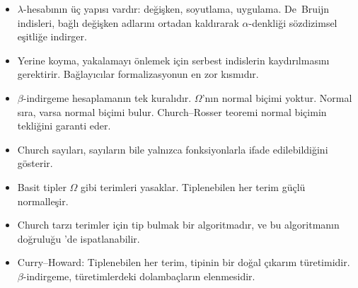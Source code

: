 \begin{bolumozeti}
\begin{itemize}
  \item $\lambda$-hesabının üç yapısı vardır: değişken, soyutlama,
        uygulama. De~Bruijn indisleri, bağlı değişken adlarını ortadan
        kaldırarak $\alpha$-denkliği sözdizimsel eşitliğe indirger.
  \item Yerine koyma, yakalamayı önlemek için serbest indislerin
        kaydırılmasını gerektirir. Bağlayıcılar formalizasyonun en zor
        kısmıdır.
  \item $\beta$-indirgeme hesaplamanın tek kuralıdır. $\Omega$'nın normal
        biçimi yoktur. Normal sıra, varsa normal biçimi bulur.
        Church--Rosser teoremi normal biçimin tekliğini garanti eder.
  \item Church sayıları, sayıların bile yalnızca fonksiyonlarla ifade
        edilebildiğini gösterir.
  \item Basit tipler $\Omega$ gibi terimleri yasaklar. Tiplenebilen her
        terim güçlü normalleşir.
  \item Church tarzı terimler için tip bulmak bir algoritmadır, ve bu
        algoritmanın doğruluğu \Lean{}'de ispatlanabilir.
  \item Curry--Howard: Tiplenebilen her terim, tipinin bir doğal çıkarım
        türetimidir. $\beta$-indirgeme, türetimlerdeki dolambaçların
        elenmesidir.
\end{itemize}
\end{bolumozeti}


